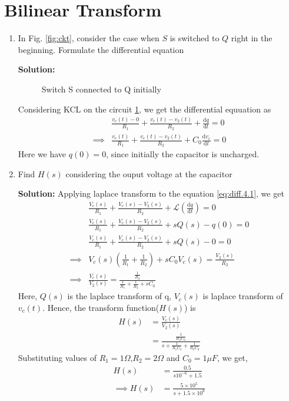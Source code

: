 \documentclass[journal,12pt,twocolumn]{IEEEtran}
\newcommand{\solution}{\noindent \textbf{Solution: }}
\providecommand{\brak}[1]{\ensuremath{\left(#1\right)}}
\providecommand{\der}[1]{\mathrm{d} #1}
\numberwithin{equation}{section}
\renewcommand\thesection{\arabic{section}}
\begin{document}
\section{Bilinear Transform}
\begin{enumerate}[label=\thesection.\arabic*.,ref=\thesection.\theenumi]
	\item In Fig. \ref{fig:ckt}, consider the case when $S$ is switched to $Q$ right in the beginning. Formulate the differential equation
	
	\solution 
		\begin{figure}[!ht]
		\centering
		
		\caption{Switch S connected to Q initially}
		\label{fig:4.1}
	\end{figure}
Considering KCL on the circuit \ref{fig:4.1}, we get the differential equuation as 
	\begin{align}
		\label{eq:diff.4.1}
		&\frac{v_c(t) - 0}{R_1} + \frac{v_c(t) - v_2(t)}{R_2} + \frac{\der{q}}{\der{t}} = 0 \\
		\implies &\frac{v_c(t)}{R_1} + \frac{v_c(t) - v_2(t)}{R_2} + C_0\frac{\der{v_c}}{\der{t}} = 0
	\end{align}
Here we have $q(0)=0$, since initially the capacitor is uncharged.
	
	\item Find $H(s)$ considering the ouput voltage at the capacitor
	
	\solution Applying laplace transform to the equation \eqref{eq:diff.4.1}, we get
		\begin{align}
		&\frac{V_c(s)}{R_1} + \frac{V_c(s) - V_2(s)}{R_2} + \mathcal{L}(\frac{\der{q}}{\der{t}})= 0 \\
		&\frac{V_c(s)}{R_1} + \frac{V_c(s) - V_2(s)}{R_2} + sQ(s) - q(0) = 0 \\
		&\frac{V_c(s)}{R_1} + \frac{V_c(s) - V_2(s)}{R_2} + sQ(s) - 0 = 0 \\
		\implies &V_c(s) \brak{\frac{1}{R_1} + \frac{1}{R_2}} + sC_0V_c(s) = \frac{V_2(s)}{R_2} \\
		\implies &\frac{V_c(s)}{V_2(s)} = \frac{\frac{1}{R_2}}{\frac{1}{R_1} + \frac{1}{R_2} + sC_0}
	\end{align}
	Here, $Q(s)$ is the laplace transform of q, $V_c(s)$ is laplace transform of $v_c(t)$.
	Hence, the transform function($H(s)$) is 
	\begin{align}
		H(s) &= \frac{V_c(s)}{V_2(s)} \\
		&=\frac{\frac{1}{R_2C_0}}{s + \frac{1}{R_1C_0} + \frac{1}{R_2C_0}}
	\end{align}
	Substituting values of $R_1=1\Omega$,$R_2=2\Omega$ and $C_0=1\mu F$, we get,
	\begin{align}
		H(s) &= \frac{0.5}{s 10^{-6} + 1.5}\\
		\label{eq:Hs}
		\implies H(s)&=\frac{5 \times 10^5}{s + 1.5 \times 10^6}
	\end{align}


\end{enumerate}
\end{document}
